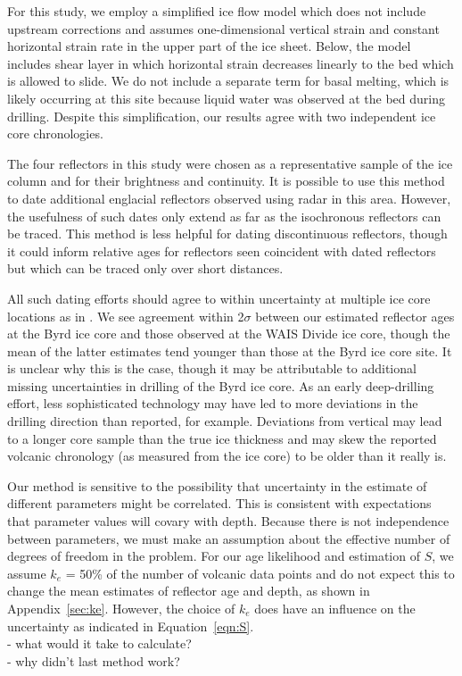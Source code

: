 For this study, we employ a simplified ice flow model which does not include upstream corrections and assumes one-dimensional vertical strain and constant horizontal strain rate in the upper part of the ice sheet. Below, the model includes shear layer in which horizontal strain decreases linearly to the bed which is allowed to slide. We do not include a separate term for basal melting, which is likely occurring at this site because liquid water was observed at the bed during drilling. Despite this simplification, our results agree with two independent ice core chronologies.

The four reflectors in this study were chosen as a representative sample of the ice column and for their brightness and continuity. It is possible to use this method to date additional englacial reflectors observed using radar in this area. However, the usefulness of such dates only extend as far as the isochronous reflectors can be traced. This method is less helpful for dating discontinuous reflectors, though it could inform relative ages for reflectors seen coincident with dated reflectors but which can be traced only over short distances. 

All such dating efforts should agree to within uncertainty at multiple ice core locations as in \citet{cavitte2016}. We see agreement within 2$\sigma$ between our estimated reflector ages at the Byrd ice core and those observed at the WAIS Divide ice core, though the mean of the latter estimates tend younger than those at the Byrd ice core site. It is unclear why this is the case, though it may be attributable to additional missing uncertainties in drilling of the Byrd ice core. As an early deep-drilling effort, less sophisticated technology may have led to more deviations in the drilling direction than reported, for example. Deviations from vertical may lead to a longer core sample than the true ice thickness and may skew the reported volcanic chronology (as measured from the ice core) to be older than it really is.

Our method is sensitive to the possibility that uncertainty in the estimate of different parameters might be correlated. This is consistent with expectations that parameter values will covary with depth. Because there is not independence between parameters, we must make an assumption about the effective number of degrees of freedom in the problem.  For our age likelihood and estimation of $S$, we assume $k_e$ = 50\% of the number of volcanic data points and do not expect this to change the mean estimates of reflector age and depth, as shown in Appendix~\ref{sec:ke}. However, the choice of $k_e$ does have an influence on the uncertainty as indicated in Equation~\ref{eqn:S}.\\
- what would it take to calculate? \\
- why didn't last method work?



